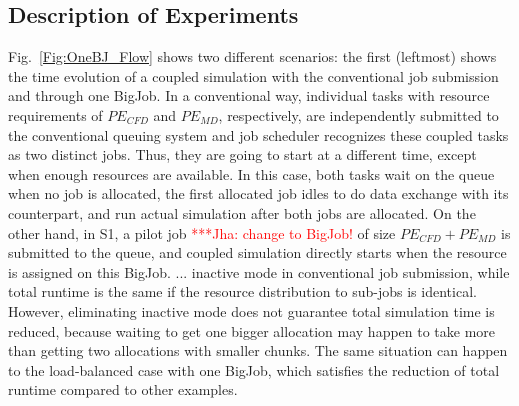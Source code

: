 \documentclass[conference,final]{IEEEtran}
\newcommand{\jhanote}[1]{ {\textcolor{red} { ***Jha: #1 }}}
\newcommand{\jhanote}[1]{}
\begin{document}

\subsection{Description of Experiments}

Fig.~\ref{Fig:OneBJ_Flow} shows two different scenarios: the first
(leftmost) shows the time evolution of a coupled simulation with the
conventional job submission and through one BigJob. In a conventional
way, individual tasks with resource requirements of $PE_{CFD}$ and
$PE_{MD}$, respectively, are independently submitted to the
conventional queuing system and job scheduler recognizes these coupled
tasks as two distinct jobs. Thus, they are going to start at a
different time, except when enough resources are available. In this
case, both tasks wait on the queue when no job is allocated, the first
allocated job idles to do data exchange with its counterpart, and run
actual simulation after both jobs are allocated. On the other hand, in
S1, a pilot job \jhanote{change to BigJob!} of size 
$PE_{CFD}+PE_{MD}$ is submitted to the queue, and coupled simulation
directly starts when the resource is assigned on this BigJob.
... inactive mode in conventional job submission, while total runtime
is the same if the resource distribution to sub-jobs is
identical. However, eliminating inactive mode does not guarantee total
simulation time is reduced, because waiting to get one bigger
allocation may happen to take more than getting two allocations with
smaller chunks. The same situation can happen to the load-balanced
case with one BigJob, which satisfies the reduction of total runtime
compared to other examples.
\end{document}
